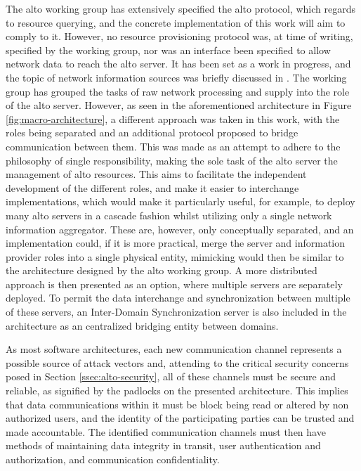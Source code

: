     The \gls{alto} working group has extensively specified the \gls{alto} protocol, which regards to resource querying, and the concrete implementation of this work will aim to comply to it.
    However, no resource provisioning protocol was, at time of writing, specified by the working group, nor was an interface been specified to allow network data to reach the \gls{alto} server.
    It has been set as a work in progress, and the topic of network information sources was briefly discussed in \cite{alto-deployment-considerations}.
    The working group has grouped the tasks of raw network processing and supply into the role of the \gls{alto} server.
    However, as seen in the aforementioned architecture in Figure \ref{fig:macro-architecture}, a different approach was taken in this work, with the roles being separated and an additional protocol proposed to bridge communication between them.
    This was made as an attempt to adhere to the philosophy of single responsibility, making the sole task of the \gls{alto} server the management of \gls{alto} resources.
    This aims to facilitate the independent development of the different roles, and make it easier to interchange implementations, which would make it particularly useful, for example, to deploy many \gls{alto} servers in a cascade fashion whilst utilizing only a single network information aggregator.
    These are, however, only conceptually separated, and an implementation could, if it is more practical, merge the server and information provider roles into a single physical entity, mimicking would then be similar to the architecture designed by the \gls{alto} working group.
    A more distributed approach is then presented as an option, where multiple servers are separately deployed.
    To permit the data interchange and synchronization between multiple of these servers, an Inter-Domain Synchronization server is also included in the architecture as an centralized bridging entity between domains.

    As most software architectures, each new communication channel represents a possible source of attack vectors and, attending to the critical security concerns posed in Section \ref{ssec:alto-security}, all of these channels must be secure and reliable, as signified by the padlocks on the presented architecture.
    This implies that data communications within it must be block being read or altered by non authorized users, and the identity of the participating parties can be trusted and made accountable.
    The identified communication channels must then have methods of maintaining data integrity in transit, user authentication and authorization, and communication confidentiality.

